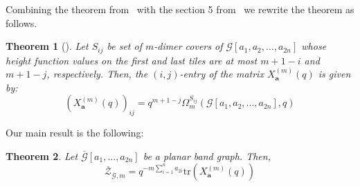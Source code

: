 \documentclass[11pt]{amsart}
\newtheorem{thm}{Theorem}[section]
\theoremstyle{definition}
\theoremstyle{remark}
\numberwithin{equation}{section}
\begin{document}
Combining the theorem from~\cite{BOSZ26} with the section 5 from~\cite{Musiker2023HigherDC} we rewrite the theorem as follows.

\begin{thm}[{\cite[Theorem 3.11]{BOSZ26}}]\label{thm: rank_gen_of_snakes}
    Let $S_{ij}$ be set of $m$-dimer covers of $\mathcal{G}[a_1,a_2,\dots,a_{2n}]$ whose height function values on the first and last tiles are at most $m+1-i$ and $m+1-j$, respectively. Then, the $(i,j)$-entry of the matrix $X^{(m)}_{\mathbf{a}}(q)$ is given by:
    \[
    (X^{(m)}_{\mathbf{a}}(q))_{ij} = 
        q^{m+1-j} \Omega_m^{S_{ij}}(\mathcal{G}[a_1,a_2,...,a_{2n}],q)
    \]
\end{thm}

Our main result is the following:

\begin{thm}\label{thm: partition_fcn_is_trace}
    Let $\overline{\mathcal{G}}[a_1,...,a_{2n}]$ be a planar band graph. Then, $$\overline{\mathcal{Z}}_{\overline{\mathcal{G}},m} = q^{-m\displaystyle\sum^{n}_{i=1}a_{2i}}\text{tr}(X^{(m)}_{\mathbf{a}}(q))$$
\end{thm}
\end{document}
